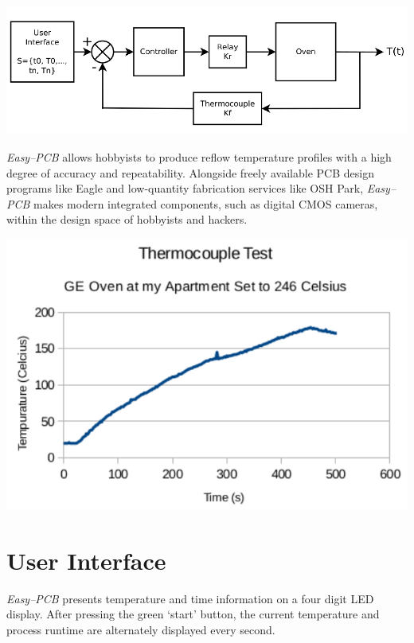 \documentclass[10pt, twocolumn]{article}
\begin{document}
\begin{center}
	\includegraphics[width=\columnwidth]{Figures/control-system.pdf}
\end{center}

\emph{Easy--PCB} allows hobbyists to produce reflow temperature profiles with
a high degree of accuracy and repeatability.
Alongside freely available PCB design programs like Eagle and low-quantity
fabrication services like OSH Park, \emph{Easy--PCB} makes
modern integrated components, such as digital CMOS cameras,
within the design space of hobbyists and hackers.

\begin{center}
	\includegraphics[width=\columnwidth]{Figures/control-results.pdf}
\end{center}

\tableofcontents

\section{User Interface}

\emph{Easy--PCB} presents temperature and time information on a four digit LED display.
After pressing the green `start' button, the current temperature and process
runtime are alternately displayed every second.
\end{document}
